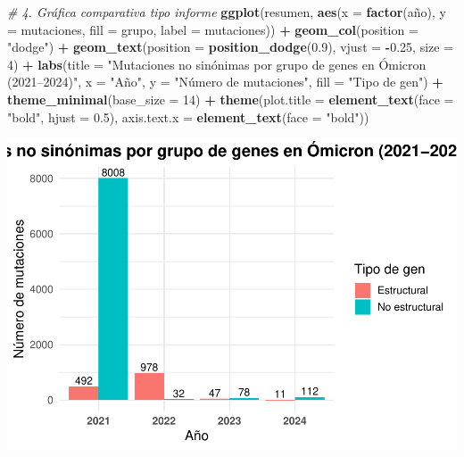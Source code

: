 \documentclass[
]{article}
\newenvironment{Shaded}{\begin{snugshade}}{\end{snugshade}}
\newcommand{\AttributeTok}[1]{\textcolor[rgb]{0.13,0.29,0.53}{#1}}
\newcommand{\CommentTok}[1]{\textcolor[rgb]{0.56,0.35,0.01}{\textit{#1}}}
\newcommand{\DecValTok}[1]{\textcolor[rgb]{0.00,0.00,0.81}{#1}}
\newcommand{\FloatTok}[1]{\textcolor[rgb]{0.00,0.00,0.81}{#1}}
\newcommand{\FunctionTok}[1]{\textcolor[rgb]{0.13,0.29,0.53}{\textbf{#1}}}
\newcommand{\NormalTok}[1]{#1}
\newcommand{\SpecialCharTok}[1]{\textcolor[rgb]{0.81,0.36,0.00}{\textbf{#1}}}
\newcommand{\StringTok}[1]{\textcolor[rgb]{0.31,0.60,0.02}{#1}}
\begin{document}
\begin{Shaded}
\begin{Highlighting}[]
\CommentTok{\# 4. Gráfica comparativa tipo informe}
\FunctionTok{ggplot}\NormalTok{(resumen, }\FunctionTok{aes}\NormalTok{(}\AttributeTok{x =} \FunctionTok{factor}\NormalTok{(año), }\AttributeTok{y =}\NormalTok{ mutaciones, }\AttributeTok{fill =}\NormalTok{ grupo, }\AttributeTok{label =}\NormalTok{ mutaciones)) }\SpecialCharTok{+}
  \FunctionTok{geom\_col}\NormalTok{(}\AttributeTok{position =} \StringTok{"dodge"}\NormalTok{) }\SpecialCharTok{+}
  \FunctionTok{geom\_text}\NormalTok{(}\AttributeTok{position =} \FunctionTok{position\_dodge}\NormalTok{(}\FloatTok{0.9}\NormalTok{), }\AttributeTok{vjust =} \SpecialCharTok{{-}}\FloatTok{0.25}\NormalTok{, }\AttributeTok{size =} \DecValTok{4}\NormalTok{) }\SpecialCharTok{+}
  \FunctionTok{labs}\NormalTok{(}\AttributeTok{title =} \StringTok{"Mutaciones no sinónimas por grupo de genes en Ómicron (2021–2024)"}\NormalTok{,}
       \AttributeTok{x =} \StringTok{"Año"}\NormalTok{, }\AttributeTok{y =} \StringTok{"Número de mutaciones"}\NormalTok{, }\AttributeTok{fill =} \StringTok{"Tipo de gen"}\NormalTok{) }\SpecialCharTok{+}
  \FunctionTok{theme\_minimal}\NormalTok{(}\AttributeTok{base\_size =} \DecValTok{14}\NormalTok{) }\SpecialCharTok{+}
  \FunctionTok{theme}\NormalTok{(}\AttributeTok{plot.title =} \FunctionTok{element\_text}\NormalTok{(}\AttributeTok{face =} \StringTok{"bold"}\NormalTok{, }\AttributeTok{hjust =} \FloatTok{0.5}\NormalTok{),}
        \AttributeTok{axis.text.x =} \FunctionTok{element\_text}\NormalTok{(}\AttributeTok{face =} \StringTok{"bold"}\NormalTok{))}
\end{Highlighting}
\end{Shaded}

\includegraphics{situacion_problema_files/figure-latex/unnamed-chunk-2-2.pdf}
\end{document}
